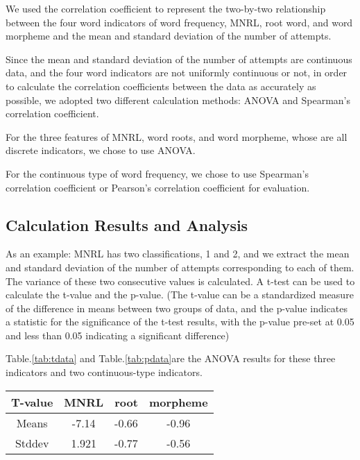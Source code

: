 \documentclass[12pt]{article}  %
\begin{document}
We used the correlation coefficient to represent the two-by-two relationship between the four word indicators of word frequency, MNRL, root word, and word morpheme and the mean and standard deviation of the number of attempts.

Since the mean and standard deviation of the number of attempts are continuous data, and the four word indicators are not uniformly continuous or not, in order to calculate the correlation coefficients between the data as accurately as possible, we adopted two different calculation methods: ANOVA and Spearman's correlation coefficient.

For the three features of MNRL, word roots, and word morpheme, whose are all discrete indicators, we chose to use ANOVA.

For the continuous type of word frequency, we chose to use Spearman's correlation coefficient or Pearson's correlation coefficient for evaluation.


\subsection{Calculation Results and Analysis}

As an example: MNRL has two classifications, 1 and 2, and we extract the mean and standard deviation of the number of attempts corresponding to each of them. The variance of these two consecutive values is calculated. A t-test can be used to calculate the t-value and the p-value. (The t-value can be a standardized measure of the difference in means between two groups of data, and the p-value indicates a statistic for the significance of the t-test results, with the p-value pre-set at 0.05 and less than 0.05 indicating a significant difference)

Table.\ref{tab:tdata} and Table.\ref{tab:pdata}are the ANOVA results for these three indicators and two continuous-type indicators.

\begin{table*}
	\centering
	\begin{tabular}{  |c|c|c|c|
		}
		
		\hline
		T-value 	& MNRL	& root	 & morpheme \\ 
		\hline
		Means	& -7.14		& -0.66		 & -0.96  \\ 
		\hline 
		Stddev & 1.921 		& -0.77		 & -0.56  \\ 
		\hline 
		
	\end{tabular}
	\caption{T-value data}
	\label{tab:tdata}
\end{table*}
\end{document}
